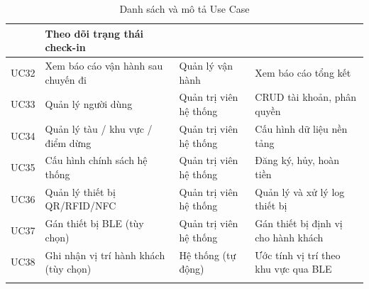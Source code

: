 \begin{longtable}{|p{1.2cm}|p{4.0cm}|p{3.5cm}|p{9.3cm}|}
    & Theo dõi trạng thái check-in \\
    \hline
    UC32 & Xem báo cáo vận hành sau chuyến đi & Quản lý vận hành & Xem báo
    cáo tổng kết \\
    \hline
    UC33 & Quản lý người dùng & Quản trị viên hệ thống & CRUD tài khoản,
    phân quyền \\
    \hline
    UC34 & Quản lý tàu / khu vực / điểm dừng & Quản trị viên hệ thống &
    Cấu hình dữ liệu nền tảng \\
    \hline
    UC35 & Cấu hình chính sách hệ thống & Quản trị viên hệ thống & Đăng
    ký, hủy, hoàn tiền \\
    \hline
    UC36 & Quản lý thiết bị QR/RFID/NFC & Quản trị viên hệ thống & Quản lý
    và xử lý log thiết bị \\
    \hline
    UC37 & Gán thiết bị BLE (tùy chọn) & Quản trị viên hệ thống & Gán thiết
    bị định vị cho hành khách \\
    \hline
    UC38 & Ghi nhận vị trí hành khách (tùy chọn) & Hệ thống (tự động) &
    Ước tính vị trí theo khu vực qua BLE \\
    \hline
    \caption{Danh sách và mô tả Use Case}
    \label{tab:usecases}
\end{longtable}
